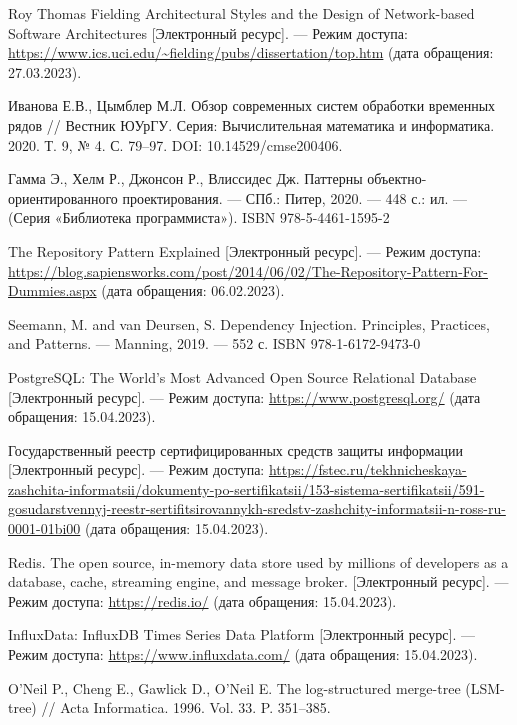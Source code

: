 \begin{thebibliography}{}
	Roy Thomas Fielding Architectural Styles and the Design of Network-based Software Architectures [Электронный ресурс]. — Режим доступа: \url{https://www.ics.uci.edu/~fielding/pubs/dissertation/top.htm} (дата обращения: 27.03.2023).
	
	Иванова Е.В., Цымблер М.Л. Обзор современных систем обработки временных рядов // Вестник ЮУрГУ. Серия: Вычислительная математика и информатика. 2020. Т. 9, № 4. С. 79–97. DOI: 10.14529/cmse200406.
	
	Гамма Э., Хелм Р., Джонсон Р., Влиссидес Дж. Паттерны объектно-ориентированного проектирования. — СПб.: Питер, 2020. — 448 с.: ил. — (Серия «Библиотека программиста»). ISBN 978-5-4461-1595-2
	
	The Repository Pattern Explained [Электронный ресурс]. — Режим доступа: \url{https://blog.sapiensworks.com/post/2014/06/02/The-Repository-Pattern-For-Dummies.aspx} (дата обращения: 06.02.2023).
	
	Seemann, M. and van Deursen, S. Dependency Injection. Principles, Practices, and Patterns. — Manning, 2019. — 552 с. ISBN 978-1-6172-9473-0
	
	PostgreSQL: The World's Most Advanced Open Source Relational Database [Электронный ресурс]. — Режим доступа: \url{https://www.postgresql.org/} (дата обращения: 15.04.2023).
	
	Государственный реестр сертифицированных средств защиты информации [Электронный ресурс]. — Режим доступа: \url{https://fstec.ru/tekhnicheskaya-zashchita-informatsii/dokumenty-po-sertifikatsii/153-sistema-sertifikatsii/591-gosudarstvennyj-reestr-sertifitsirovannykh-sredstv-zashchity-informatsii-n-ross-ru-0001-01bi00} (дата обращения: 15.04.2023).
	
	Redis. The open source, in-memory data store used by millions of developers as a database, cache, streaming engine, and message broker. [Электронный ресурс]. — Режим доступа: \url{https://redis.io/} (дата обращения: 15.04.2023).
	
	InfluxData: InfluxDB Times Series Data Platform [Электронный ресурс]. — Режим доступа: \url{https://www.influxdata.com/} (дата обращения: 15.04.2023).
	
	 O’Neil P., Cheng E., Gawlick D., O’Neil E. The log-structured merge-tree (LSM-tree) // Acta Informatica. 1996. Vol. 33. P. 351–385.
	 

\end{thebibliography}
